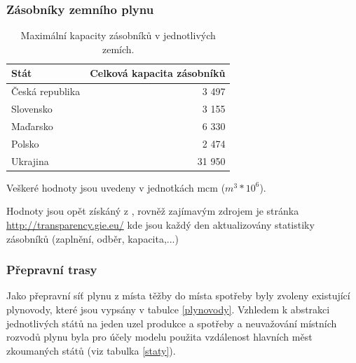 \documentclass[a4paper,11pt]{article}
\begin{document}
\vspace{5cm}



\subsubsection{Zásobníky zemního plynu}\label{zasobniky}

\begin{table}[h!]
\begin{center}
\begin{tabular}{|l|r|}
    \hline
    Stát 			& Celková kapacita zásobníků\\
    \hline 
    Česká republika	& 3 497\\ 
    Slovensko 		& 3 155\\
    Maďarsko 		& 6 330\\
    Polsko 			& 2 474\\
    Ukrajina 		& 31 950\\
    \hline
\end{tabular}
\caption{Maximální kapacity zásobníků v jednotlivých zemích.} 
Veškeré hodnoty jsou uvedeny v jednotkách mcm ($m^3 * 10^6$).
\label{zasobnikytable}
\end{center}
\end{table}

Hodnoty jsou opět získáný z \cite{IEA}, rovněž zajímavým zdrojem je stránka \url{http://transparency.gie.eu/}
kde jsou každý den aktualizovány statistiky zásobníků (zaplnění, odběr, kapacita,...)

\subsubsection{Přepravní trasy}\label{Preprava}

Jako přepravní síť plynu z místa těžby do místa spotřeby byly zvoleny existující plynovody,
které jsou vypsány v tabulce \ref{plynovody}.
Vzhledem k abstrakci jednotlivých států na jeden uzel produkce a spotřeby
a neuvažování místních rozvodů plynu
byla pro účely modelu použita vzdálenost hlavních měst zkoumaných států
(viz tabulka \ref{staty}).
\end{document}
